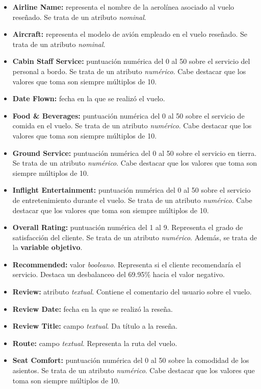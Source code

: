 \documentclass[es]{uc3mreport}
\begin{document}
\begin{report}
\begin{itemize}
    \item \textbf{Airline Name:} representa el nombre de la aerolínea asociado al vuelo reseñado. Se trata de un atributo \textit{nominal}.
    \item \textbf{Aircraft:} representa el modelo de avión empleado en el vuelo reseñado. Se trata de un atributo \textit{nominal}.
    \item \textbf{Cabin Staff Service:} puntuación numérica del 0 al 50 sobre el servicio del personal a bordo. Se trata de un atributo \textit{numérico}. Cabe destacar que los valores que toma son siempre múltiplos de 10.
    \item \textbf{Date Flown:} fecha en la que se realizó el vuelo.
    \item \textbf{Food \& Beverages:} puntuación numérica del 0 al 50 sobre el servicio de comida en el vuelo. Se trata de un atributo \textit{numérico}. Cabe destacar que los valores que toma son siempre múltiplos de 10.
    \item \textbf{Ground Service:} puntuación numérica del 0 al 50 sobre el servicio en tierra. Se trata de un atributo \textit{numérico}. Cabe destacar que los valores que toma son siempre múltiplos de 10.
    \item \textbf{Inflight Entertainment:} puntuación numérica del 0 al 50 sobre el servicio de entretenimiento durante el vuelo. Se trata de un atributo \textit{numérico}. Cabe destacar que los valores que toma son siempre múltiplos de 10.
    \item \textbf{Overall Rating:} puntuación numérica del 1 al 9. Representa el
    grado de satisfacción del cliente. Se trata de un atributo
    \textit{numérico}. Además, se trata de la \textbf{variable objetivo}.
    \item \textbf{Recommended:} valor \textit{booleano}. Representa si el cliente recomendaría el servicio. Destaca un desbalanceo del 69.95\% hacia el valor negativo.
    \item \textbf{Review:} atributo \textit{textual}. Contiene el comentario del usuario sobre el vuelo.
    \item \textbf{Review Date:} fecha en la que se realizó la reseña.
    \item \textbf{Review Title:} campo \textit{textual}. Da título a la reseña.
    \item \textbf{Route:} campo \textit{textual}. Representa la ruta del vuelo.
    \item \textbf{Seat Comfort:} puntuación numérica del 0 al 50 sobre la comodidad de los asientos. Se trata de un atributo \textit{numérico}. Cabe destacar que los valores que toma son siempre múltiplos de 10.

\end{itemize}
\end{report}
\end{document}
